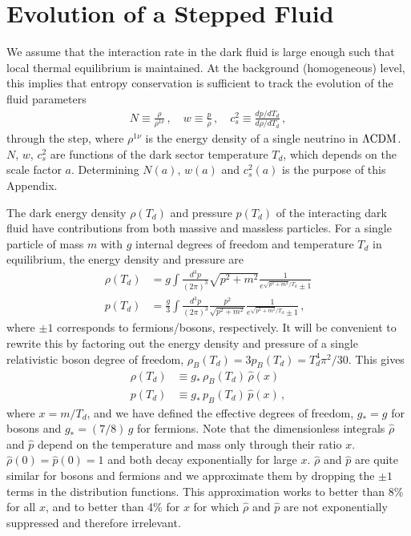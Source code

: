 \documentclass[aps,prd,twocolumn,nofootinbib,superscriptaddress]{revtex4}
\def\bea{\begin{eqnarray}}
\def\eea{\end{eqnarray}}
\def\lcdm{$\Lambda{\rm CDM}$}
\begin{document}


\appendix
\section{Evolution of a Stepped Fluid}
\label{app:background}

We assume that the interaction rate in the dark fluid is large enough such that local thermal equilibrium is maintained. At the background (homogeneous) level, this implies that entropy conservation is sufficient to track the evolution of the fluid parameters 
\bea\label{eq:define N,w,cs2}
N\equiv \frac{\rho}{\rho^{1\nu}}\, , \quad w\equiv \frac{p}{\rho} \, , \quad
c_s^2\equiv \frac{dp/dT_d}{d\rho/dT_d}
\, ,
\eea
through the step, where $\rho^{1 \nu}$ is the energy density of a single neutrino in \lcdm. $N$, $w$, $c_s^2$ are functions of the dark sector temperature $T_d$, which depends on the scale factor $a$. Determining $N(a)$, $w(a)$ and $c_s^2(a)$ is the purpose of this Appendix. 

The dark energy density $\rho(T_d)$ and pressure $p(T_d)$ of the interacting dark fluid have contributions from both massive and massless particles. For a single particle of mass $m$ with $g$ internal degrees of freedom
and temperature $T_d$ in equilibrium, the energy density and pressure are
\begin{align}
\rho(T_d)&=g \int \frac{d^3p}{(2 \pi)^3} \sqrt{p^2+m^2} \frac{1}{e^{\sqrt{p^2+m^2}/T_d}\pm1}
\nonumber \\
p(T_d)&=\frac{g}{3} \int \frac{d^3p}{(2 \pi)^3} \frac{p^2}{\sqrt{p^2+m^2}} \frac{1}{e^{\sqrt{p^2+m^2}/T_d}\pm1} \, ,
\end{align}
where $\pm 1$ corresponds to fermions/bosons, respectively. It will be convenient to rewrite this by factoring out the energy density and pressure of a single relativistic boson degree of freedom, $\rho_B(T_d)=3 p_B(T_d)=T_d^4 \pi^2/30$. This gives
\begin{align}
\rho(T_d)&\equiv g_*\, \rho_B(T_d)\, \hat\rho(x)
\nonumber \\
p(T_d)&\equiv g_*\, p_B(T_d)\, \hat p(x)
\, ,
\end{align}
where $x=m/T_d$, and we have defined the effective degrees of freedom, $g_*=g$ for bosons and $g_* = (7/8)\, g$ for fermions.
Note that the dimensionless integrals $\hat \rho$ and $\hat p$ depend on the temperature and mass only through their ratio $x$. 
$\hat\rho(0)=\hat p(0)=1$ and both decay exponentially for large $x$. $\hat \rho$ and $\hat p$ are quite similar for bosons and fermions and we approximate them by dropping the $\pm1$ terms in the distribution functions. This approximation works to better than 8\% for all $x$, and to better than 4\% for $x$ for which $\hat \rho$ and $\hat p$ are not exponentially suppressed and therefore irrelevant.
\end{document}

